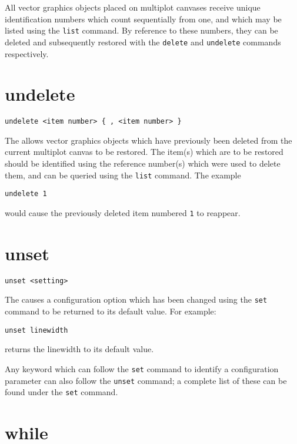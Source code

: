 All vector graphics objects placed on multiplot canvases receive unique
identification numbers which count sequentially from one, and which may be
listed using the {\tt list} command.  By reference to these numbers, they can
be deleted and subsequently restored with the {\tt delete} and {\tt undelete}
commands respectively.


\section{undelete}

\begin{verbatim}
undelete <item number> { , <item number> }
\end{verbatim}

The  allows vector graphics objects which have previously
been deleted from the current multiplot canvas to be restored.  The item(s)
which are to be restored should be identified using the reference number(s)
which were used to delete them, and can be queried using the {\tt list}
command. The example

\begin{verbatim}
undelete 1
\end{verbatim}

\noindent would cause the previously deleted item numbered {\tt 1} to reappear.


\section{unset}

\begin{verbatim}
unset <setting>
\end{verbatim}

The  causes a configuration option which has been changed using
the {\tt set} command to be returned to its default value.  For example:

\begin{verbatim}
unset linewidth
\end{verbatim}

\noindent returns the linewidth to its default value.

Any keyword which can follow the {\tt set} command to identify a configuration
parameter can also follow the {\tt unset} command; a complete list of these can
be found under the {\tt set} command.


\section{while}

